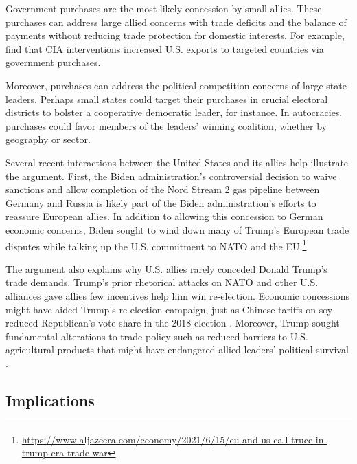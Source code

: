 \documentclass[12pt]{article}
\begin{document}
Government purchases are the most likely concession by small allies. 
These purchases can address large allied concerns with trade deficits and the balance of payments without reducing trade protection for domestic interests. 
For example, \citep{Bergeretal2013} find that CIA interventions increased U.S. exports to targeted countries via government purchases.


Moreover, purchases can address the political competition concerns of large state leaders.
Perhaps small states could target their purchases in crucial electoral districts to bolster a cooperative democratic leader, for instance. 
In autocracies, purchases could favor members of the leaders' winning coalition, whether by geography or sector.


Several recent interactions between the United States and its allies help illustrate the argument. 
First, the Biden administration's controversial decision to waive sanctions and allow completion of the Nord Stream 2 gas pipeline between Germany and Russia is likely part of the Biden administration's efforts to reassure European allies. 
In addition to allowing this concession to German economic concerns, Biden sought to wind down many of Trump's European trade disputes while talking up the U.S. commitment to NATO and the EU.\footnote{\url{https://www.aljazeera.com/economy/2021/6/15/eu-and-us-call-truce-in-trump-era-trade-war}}


The argument also explains why U.S. allies rarely conceded Donald Trump's trade demands. 
Trump's prior rhetorical attacks on NATO and other U.S. alliances gave allies few incentives help him win re-election. 
Economic concessions might have aided Trump's re-election campaign, just as Chinese tariffs on soy reduced Republican's vote share in the 2018 election \citep{ChyzhUrbatsch2021}. 
Moreover, Trump sought fundamental alterations to trade policy such as reduced barriers to U.S. agricultural products that might have endangered allied leaders' political survival \citep{HeeParkJensen2007}.



\subsection{Implications}
\end{document}
